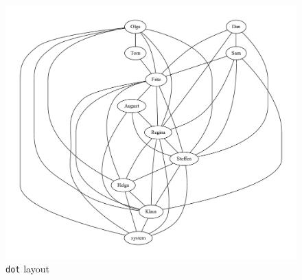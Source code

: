 \documentclass[a4paper]{scrartcl}
\newcommand{\code}[1]{\texttt{\color{code}#1}}
\begin{document}
\begin{figure}
\parbox[b]{0.7\textwidth}{
  \includegraphics[width=\linewidth]{gv_ca-dot}\vspace{-7mm}
  \caption{\code{dot} layout}
  \label{fig:gv-cadot}}%
\parbox[b]{0.3\textwidth}{\centering
}
\end{figure}
\end{document}

